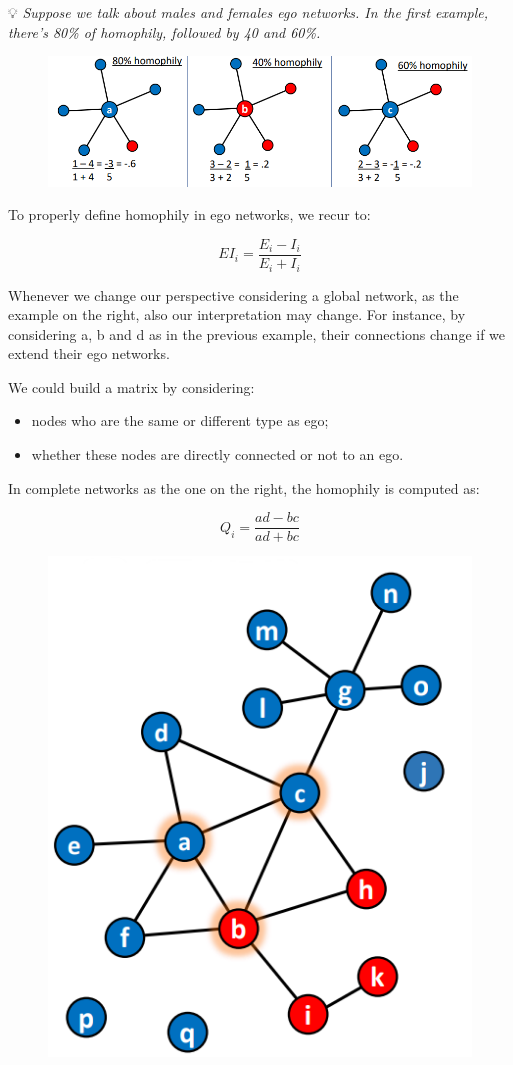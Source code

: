 \documentclass[
  notitlepage,
  onecolumn,
  openany]{book}
\providecommand{\tightlist}{%
  \setlength{\itemsep}{0pt}\setlength{\parskip}{0pt}}
\begin{document}
💡 \emph{Suppose we talk about males and females ego networks. In the first example, there's 80\% of homophily, followed by 40 and 60\%.}

\begin{figure}[h!]

{\centering \includegraphics[width=0.5\linewidth]{images/06-Attributes based measures/Untitled 2} 

}

\end{figure}

To properly define homophily in ego networks, we recur to:

\[
EI_i = \frac{E_i-I_i}{E_i+I_i}
\]

Whenever we change our perspective considering a global network, as the example on the right, also our interpretation may change. For instance, by considering a, b and d as in the previous example, their connections change if we extend their ego networks.

We could build a matrix by considering:

\begin{itemize}
\tightlist
\item
  nodes who are the same or different type as ego;
\item
  whether these nodes are directly connected or not to an ego.
\end{itemize}

In complete networks as the one on the right, the homophily is computed as:

\[
Q_i = \frac{ad-bc}{ad+bc}
\]

\begin{figure}[h!]

{\centering \includegraphics[width=0.3\linewidth]{images/06-Attributes based measures/Untitled 3} 

}

\end{figure}
\end{document}
